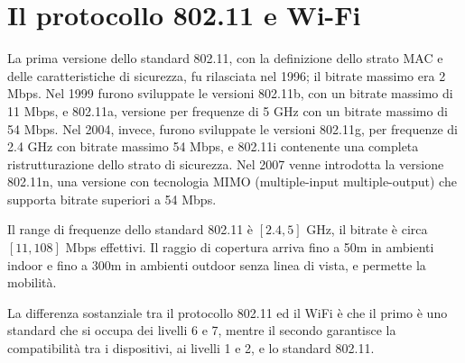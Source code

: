 \section{Il protocollo 802.11 e Wi-Fi}
La prima versione dello standard 802.11, con la definizione dello strato MAC e delle caratteristiche di sicurezza, fu rilasciata nel 1996; il bitrate massimo era 2 Mbps. Nel 1999 furono sviluppate le versioni 802.11b, con un bitrate massimo di 11 Mbps, e 802.11a, versione per frequenze di 5 GHz con un bitrate massimo di 54 Mbps. Nel 2004, invece, furono sviluppate le versioni 802.11g, per frequenze di 2.4 GHz con bitrate massimo 54 Mbps, e 802.11i contenente una completa ristrutturazione dello strato di sicurezza. Nel 2007 venne introdotta la versione 802.11n, una versione con tecnologia MIMO (multiple-input multiple-output) che supporta bitrate superiori a 54 Mbps.

Il range di frequenze dello standard 802.11 è $[2.4, 5]$ GHz, il bitrate è circa $[11, 108]$ Mbps effettivi. Il raggio di copertura arriva fino a 50m in ambienti indoor e fino a 300m in ambienti outdoor senza linea di vista, e permette la mobilità.

La differenza sostanziale tra il protocollo 802.11 ed il WiFi è che il primo è uno standard che si occupa dei livelli 6 e 7, mentre il secondo garantisce la compatibilità tra i dispositivi, ai livelli 1 e 2, e lo standard 802.11.

